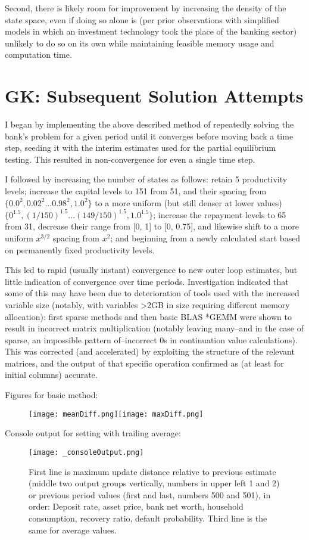 \documentclass[english]{article}
\begin{document}
Second, there is likely room for improvement by increasing the density of the state space, even if 
doing so alone is (per prior observations with simplified models in which an investment technology 
took the place of the banking sector) unlikely to do so on its own while maintaining feasible memory 
usage and computation time.

\section{GK: Subsequent Solution Attempts}
I began by implementing the above described method of repeatedly solving the bank's problem for a 
given period until it converges before moving back a time step, seeding it with the interim estimates 
used for the partial equilibrium testing. This resulted in non-convergence for even a single time step.

I followed by increasing the number of states as follows: retain 5 productivity levels; increase 
the capital levels to 151 from 51, and their spacing from $\{0.0^2, 0.02^2 ... 0.98^2, 1.0^2\}$ to 
a more uniform (but still denser at lower values) $\{0^{1.5}, (1/150)^{1.5} ... (149/150)^{1.5}, 1.0^{1.5}\}$; 
increase the repayment levels to 65 from 31, decrease their range from [0, 1] to [0, 0.75], and likewise 
shift to a more uniform $x^{3/2}$ spacing from $x^2$; and beginning from a newly calculated start based 
on permanently fixed productivity levels. 

This led to rapid (usually instant) convergence to new outer loop estimates, but little indication of 
convergence over time periods. Investigation indicated that some of this may have been due to deterioration 
of tools used with the increased variable size (notably, with variables >2GB in size requiring different 
memory allocation): first sparse methods and then basic BLAS *GEMM were shown to result in incorrect 
matrix multiplication (notably leaving many--and in the case of sparse, an impossible pattern of--incorrect 0s 
in continuation value calculations). This was corrected (and accelerated) by exploiting the structure of the 
relevant matrices, and the output of that specific operation confirmed as (at least for initial columns) accurate. 

Figures for basic method:
\begin{figure}[H]
\centering
		\texttt{[image: meanDiff.png]}\texttt{[image: maxDiff.png]}
\end{figure}
Console output for setting with trailing average:
\begin{figure}[H]
\centering
		\texttt{[image: \_consoleOutput.png]}

First line is maximum update distance relative to previous estimate (middle two output groups vertically, numbers in upper left 1 and 2) or previous period values (first and last, numbers 500 and 501), in order: Deposit rate, asset price, bank net worth, household consumption, recovery ratio, default probability. Third line is the same for average values.
\end{figure}
\end{document}
